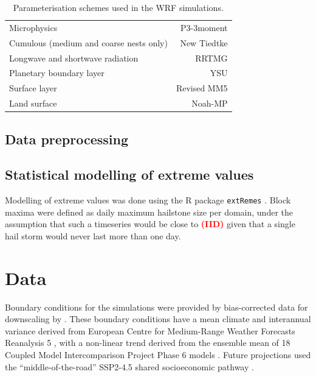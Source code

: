 \documentclass[]{agujournal2019}
\newcommand*{\todo}[1]{\textbf{\textcolor{red}{(#1)}}}
\begin{document}
\begin{table}[h!]
\caption{Parameterisation schemes used in the WRF simulations.}
\label{tab:schemes}
\centering
\begin{tabular}{lr}
      \hline
      Microphysics & P3-3moment \cite{Milbrandt_JAS_2021} \\
      Cumulous (medium and coarse nests only) & New Tiedtke \cite{Zhang_JC_2017} \\
      Longwave and shortwave radiation & RRTMG \cite{Iacono_JGRA_2008} \\
      Planetary boundary layer & YSU \cite{Hong_MWR_2006} \\
      Surface layer & Revised MM5 \cite{Jimenez_MWR_2012} \\
      Land surface & Noah-MP \cite{Niu_JGRA_2011} \\
      \hline
\end{tabular}
\end{table}

\subsection{Data preprocessing}

\subsection{Statistical modelling of extreme values}

Modelling of extreme values was done using the R \cite{R_software} package \texttt{extRemes} \cite{Gilleland_JSS_2016}. Block maxima were defined as daily maximum hailstone size per domain, under the assumption that such a timeseries would be close to \todo{IID} given that a single hail storm would never last more than one day.  

\section{Data}

Boundary conditions for the simulations were provided by bias-corrected data for downscaling by . These boundary conditions have a mean climate and interannual variance derived from European Centre for Medium-Range Weather Forecasts Reanalysis 5 \cite<ERA5,>{Hersbach_QJRMS_2020}, with a non-linear trend derived from the ensemble mean of 18 Coupled Model Intercomparison Project Phase 6 \cite<CMIP6,>{Eyring_GMD_2016} models \cite{Xu_SD_2021}. Future projections used the ``middle-of-the-road'' SSP2-4.5 shared socioeconomic pathway \cite<SSP,>{ONeill_GEC_2017}.
\end{document}
